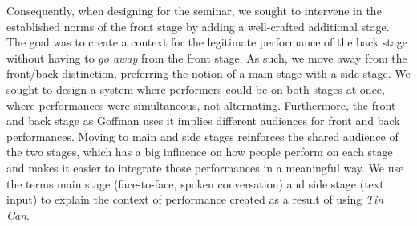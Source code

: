 Consequently, when designing for the seminar, we sought to intervene in the established norms of the front stage by adding a well-crafted additional stage. The goal was to create a context for the legitimate performance of the back stage without having to \emph{go away} from the front stage.  As such, we move away from the front/back distinction, preferring the notion of a main stage with a side stage. We sought to design a system where performers could be on both stages at once, where performances were simultaneous, not alternating. Furthermore, the front and back stage as Goffman uses it implies different audiences for front and back performances. Moving to main and side stages reinforces the shared audience of the two stages, which has a big influence on how people perform on each stage and makes it easier to integrate those performances in a meaningful way. We use the terms main stage (face-to-face, spoken conversation) and side stage (text input) to explain the context of performance created as a result of using \emph{Tin Can}.  




